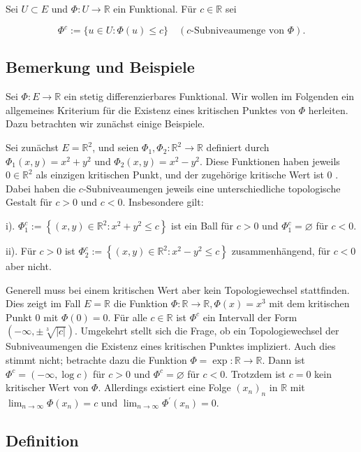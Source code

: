 \documentclass[10pt, letterpaper]{article}
\begin{document}
Sei $U \subset E$ und $\Phi: U \rightarrow \mathbb{R}$ ein Funktional. Für $c \in \mathbb{R}$ sei

$$
\Phi^{c}:=\{u \in U: \Phi(u) \leq c\} \quad(c \text {-Subniveaumenge von } \Phi) .
$$

\subsection*{Bemerkung und Beispiele}

Sei $\Phi: E \rightarrow \mathbb{R}$ ein stetig differenzierbares Funktional. Wir wollen im Folgenden ein allgemeines Kriterium für die Existenz eines kritischen Punktes von $\Phi$ herleiten. Dazu betrachten wir zunächst einige Beispiele.

Sei zunächst $E=\mathbb{R}^{2}$, und seien $\Phi_{1}, \Phi_{2}: \mathbb{R}^{2} \rightarrow \mathbb{R}$ definiert durch $\Phi_{1}(x, y)=x^{2}+y^{2}$ und $\Phi_{2}(x, y)=x^{2}-y^{2}$. Diese Funktionen haben jeweils $0 \in \mathbb{R}^{2}$ als einzigen kritischen Punkt, und der zugehörige kritische Wert ist 0 . Dabei haben die $c$-Subniveaumengen jeweils eine unterschiedliche topologische Gestalt für $c>0$ und $c<0$. Insbesondere gilt:

i). $\Phi_{1}^{c}:=\left\{(x, y) \in \mathbb{R}^{2}: x^{2}+y^{2} \leq c\right\}$ ist ein Ball für $c>0$ und $\Phi_{1}^{c}=\varnothing$ für $c<0$.

ii). Für $c>0$ ist $\Phi_{2}^{c}:=\left\{(x, y) \in \mathbb{R}^{2}: x^{2}-y^{2} \leq c\right\}$ zusammenhängend, für $c<0$ aber nicht.

Generell muss bei einem kritischen Wert aber kein Topologiewechsel stattfinden. Dies zeigt im Fall $E=\mathbb{R}$ die Funktion $\Phi: \mathbb{R} \rightarrow \mathbb{R}, \Phi(x)=x^{3}$ mit dem kritischen Punkt 0 mit $\Phi(0)=0$. Für alle $c \in \mathbb{R}$ ist $\Phi^{c}$ ein Intervall der Form $(-\infty, \pm \sqrt[3]{|c|})$. Umgekehrt stellt sich die Frage, ob ein Topologiewechsel der Subniveaumengen die Existenz eines kritischen Punktes impliziert. Auch dies stimmt nicht; betrachte dazu die Funktion $\Phi=\exp : \mathbb{R} \rightarrow \mathbb{R}$. Dann ist $\Phi^{c}=(-\infty, \log c)$ für $c>0$ und $\Phi^{c}=\varnothing$ für $c<0$. Trotzdem ist $c=0$ kein kritischer Wert von $\Phi$. Allerdings existiert eine Folge $\left(x_{n}\right)_{n}$ in $\mathbb{R}$ mit $\lim _{n \rightarrow \infty} \Phi\left(x_{n}\right)=c$ und $\lim _{n \rightarrow \infty} \Phi^{\prime}\left(x_{n}\right)=0$.

\subsection*{Definition}
\end{document}
